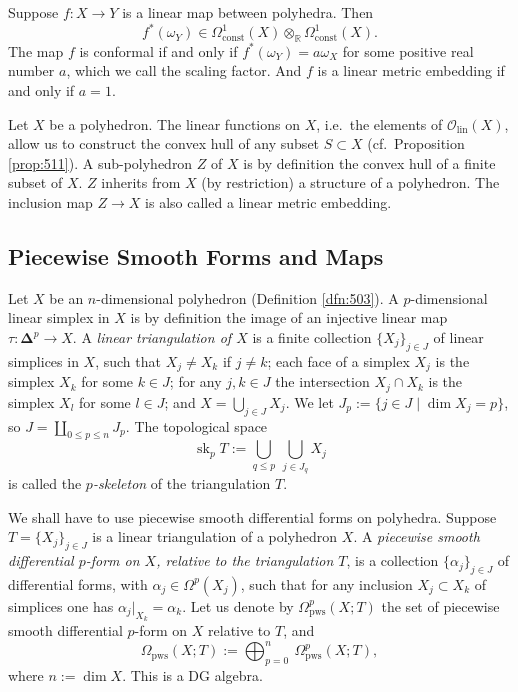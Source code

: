 \documentclass[10pt, a4paper]{amsart}
\theoremstyle{definition}
\numberwithin{equation}{section}
\newcommand{\opn}{\operatorname}
\newcommand{\mcal}[1]{\mathcal{#1}}
\newcommand{\mrm}[1]{\mathrm{#1}}
\newcommand{\mbb}[1]{\mathbb{#1}}
\newcommand{\bsym}[1]{\boldsymbol{#1}}
\newcommand{\R}{\mbb{R}}
\begin{document}
Suppose $f : X \to Y$ is a linear map between polyhedra. Then
\[ f^*(\omega_Y) \in 
\Omega^1_{\mrm{const}}(X) \otimes_{\R} \Omega^1_{\mrm{const}}(X) . \]
The map $f$ is conformal if and only if
$f^*(\omega_Y) = a \omega_X$
for some positive real number $a$, which we call the scaling factor.
And $f$ is a linear metric embedding if and only if $a = 1$.

Let $X$ be a polyhedron. The linear functions on $X$, i.e.\ the elements of 
$\mcal{O}_{\mrm{lin}}(X)$, allow us to construct the convex hull of any
subset $S \subset X$ (cf.\ Proposition \ref{prop:511}). A sub-polyhedron $Z$ of
$X$ is by definition the convex
hull of a finite subset of $X$. $Z$ inherits from $X$ (by restriction) a
structure of a polyhedron. The inclusion map $Z \to X$ is also called a linear
metric embedding. 


\subsection{Piecewise Smooth Forms and Maps} \label{subsec:pws}
Let $X$ be an $n$-dimen\-sional polyhedron (Definition \ref{dfn:503}). A
$p$-dimensional linear
simplex in $X$ is by definition the image of an injective linear map 
$\tau : \bsym{\Delta}^p \to X$. 
A {\em linear triangulation of $X$} is a finite collection
$\{ X_j \}_{j \in J}$ of linear simplices in $X$, such that 
$X_j \neq X_k$ if $j \neq k$; each face of
a simplex $X_j$ is the simplex $X_k$ for some $k \in J$; 
for any $j, k \in J$ the intersection $X_j \cap X_k$ is the simplex
$X_l$ for some $l \in J$; and $X = \bigcup_{j \in J} X_j$. 
We let 
$J_p := \{ j \in J \mid \opn{dim} X_j = p \}$,
so 
$J = \coprod_{0 \leq p \leq n} J_p$.
The topological space 
\[ \opn{sk}_p T := \bigcup_{q \leq p} \ \bigcup_{j \in J_{q}} X_j \] 
is called the {\em $p$-skeleton} of the triangulation $T$. 

We shall have to use piecewise smooth differential forms on polyhedra. 
Suppose $T = \{ X_j \}_{j \in J}$ is a linear triangulation of a
polyhedron $X$. A {\em piecewise smooth differential $p$-form on $X$, relative
to the triangulation $T$}, is a collection 
$\{ \alpha_j \}_{j \in J}$ of differential forms, with
$\alpha_j \in \Omega^p(X_j)$,
such that for any inclusion $X_j \subset X_k$ of simplices one has
$\alpha_j |_{X_k} = \alpha_k$.
Let us denote by $\Omega^p_{\mrm{pws}}(X; T)$ the set of 
piecewise smooth differential $p$-form on $X$ relative to $T$, and
\[ \Omega_{\mrm{pws}}(X; T) := 
\bigoplus_{p = 0}^n \ \Omega^p_{\mrm{pws}}(X; T) , \]
where $n := \opn{dim} X$. This is a DG algebra. 
\end{document}
